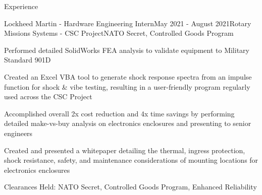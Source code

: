\documentclass{resume} %
\begin{document}
\begin{rSection}{Experience}

\begin{rSubsection}{Lockheed Martin - Hardware Engineering Intern}{May 2021 - August 2021}{Rotary Missions Systems - CSC Project}{NATO Secret, Controlled Goods Program}

\item Performed detailed SolidWorks FEA analysis to validate equipment to Military Standard 901D
\item Created an Excel VBA tool to generate shock response spectra from an impulse function for shock \& vibe testing, resulting in a user-friendly program regularly used across the CSC Project
\item Accomplished overall 2x cost reduction and 4x time savings by performing detailed make-vs-buy analysis on electronics enclosures and presenting to senior engineers
\item Created and presented a whitepaper detailing the thermal, ingress protection, shock resistance, safety, and maintenance considerations of mounting locations for electronics enclosures
\item Clearances Held: NATO Secret, Controlled Goods Program, Enhanced Reliability

\end{rSubsection}

\begin{comment}

\begin{rSubsection}{Department of National Defense - Engineering Intern}{May 2020 - September 2020}{}{}

\item Documented and presented key specifications on armored patrol vehicles for 411 vehicles in 69 variants
\item Reworked procurement documents based on technical requirements from multiple military bases
\item Proofread english-to-french translations of contracts to ensure correctness

\end{rSubsection}
\end{comment}
\end{rSection}
\end{document}
